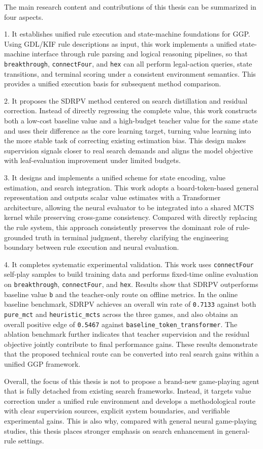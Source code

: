 The main research content and contributions of this thesis can be summarized in four aspects.

1. It establishes unified rule execution and state-machine foundations for GGP. Using GDL/KIF rule descriptions as input, this work implements a unified state-machine interface through rule parsing and logical reasoning pipelines, so that \texttt{breakthrough}, \texttt{connectFour}, and \texttt{hex} can all perform legal-action queries, state transitions, and terminal scoring under a consistent environment semantics. This provides a unified execution basis for subsequent method comparison.

2. It proposes the SDRPV method centered on search distillation and residual correction. Instead of directly regressing the complete value, this work constructs both a low-cost baseline value and a high-budget teacher value for the same state and uses their difference as the core learning target, turning value learning into the more stable task of correcting existing estimation bias. This design makes supervision signals closer to real search demands and aligns the model objective with leaf-evaluation improvement under limited budgets.

3. It designs and implements a unified scheme for state encoding, value estimation, and search integration. This work adopts a board-token-based general representation and outputs scalar value estimates with a Transformer architecture, allowing the neural evaluator to be integrated into a shared MCTS kernel while preserving cross-game consistency. Compared with directly replacing the rule system, this approach consistently preserves the dominant role of rule-grounded truth in terminal judgment, thereby clarifying the engineering boundary between rule execution and neural evaluation.

4. It completes systematic experimental validation. This work uses \texttt{connectFour} self-play samples to build training data and performs fixed-time online evaluation on \texttt{breakthrough}, \texttt{connectFour}, and \texttt{hex}. Results show that SDRPV outperforms baseline value \texttt{b} and the teacher-only route on offline metrics. In the online baseline benchmark, SDRPV achieves an overall win rate of \texttt{0.7133} against both \texttt{pure_mct} and \texttt{heuristic_mcts} across the three games, and also obtains an overall positive edge of \texttt{0.5467} against \texttt{baseline_token_transformer}. The ablation benchmark further indicates that teacher supervision and the residual objective jointly contribute to final performance gains. These results demonstrate that the proposed technical route can be converted into real search gains within a unified GGP framework.

Overall, the focus of this thesis is not to propose a brand-new game-playing agent that is fully detached from existing search frameworks. Instead, it targets value correction under a unified rule environment and develops a methodological route with clear supervision sources, explicit system boundaries, and verifiable experimental gains. This is also why, compared with general neural game-playing studies, this thesis places stronger emphasis on search enhancement in general-rule settings.
